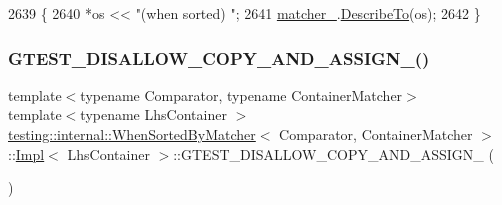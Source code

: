 \begin{DoxyCode}
2639                                                   \{
2640       *os << \textcolor{stringliteral}{"(when sorted) "};
2641       \hyperlink{classtesting_1_1internal_1_1WhenSortedByMatcher_1_1Impl_a4675b8bb38c5996ad8e570eafe4f72ea}{matcher\_}.\hyperlink{classtesting_1_1internal_1_1MatcherBase_a7e0c883c7745e0d646463077ef1c1267}{DescribeTo}(os);
2642     \}
\end{DoxyCode}
\mbox{\label{classtesting_1_1internal_1_1WhenSortedByMatcher_1_1Impl_af5327d86f58f006cba4e49eb26c69d79}} 
\subsubsection{\texorpdfstring{G\+T\+E\+S\+T\+\_\+\+D\+I\+S\+A\+L\+L\+O\+W\+\_\+\+C\+O\+P\+Y\+\_\+\+A\+N\+D\+\_\+\+A\+S\+S\+I\+G\+N\+\_\+()}{GTEST\_DISALLOW\_COPY\_AND\_ASSIGN\_()}}
{\footnotesize\ttfamily template$<$typename Comparator, typename Container\+Matcher$>$ \\
template$<$typename Lhs\+Container $>$ \\
\hyperlink{classtesting_1_1internal_1_1WhenSortedByMatcher}{testing\+::internal\+::\+When\+Sorted\+By\+Matcher}$<$ Comparator, Container\+Matcher $>$\+::\hyperlink{classtesting_1_1internal_1_1WhenSortedByMatcher_1_1Impl}{Impl}$<$ Lhs\+Container $>$\+::G\+T\+E\+S\+T\+\_\+\+D\+I\+S\+A\+L\+L\+O\+W\+\_\+\+C\+O\+P\+Y\+\_\+\+A\+N\+D\+\_\+\+A\+S\+S\+I\+G\+N\+\_\+ (\begin{DoxyParamCaption}\item[{\hyperlink{classtesting_1_1internal_1_1WhenSortedByMatcher_1_1Impl}{Impl}$<$ Lhs\+Container $>$}]{ }\end{DoxyParamCaption})\hspace{0.3cm}{\ttfamily [private]}}

